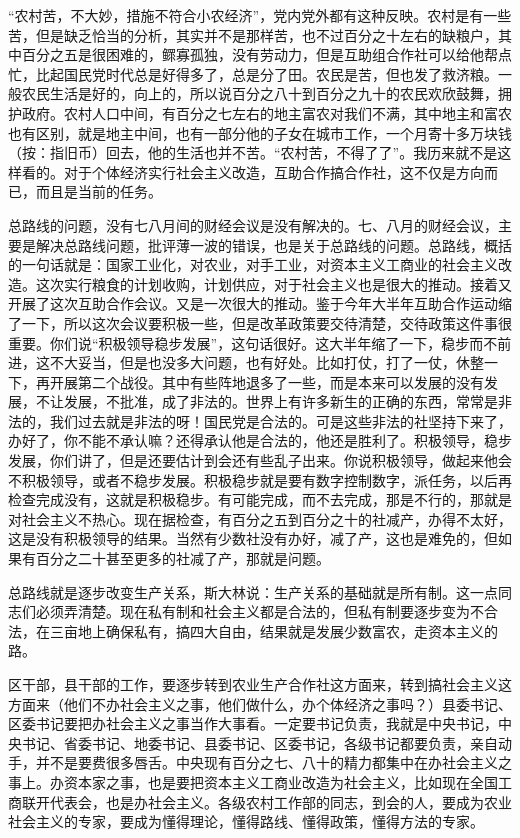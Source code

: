 “农村苦，不大妙，措施不符合小农经济”，党内党外都有这种反映。农村是有一些苦，但是缺乏恰当的分析，其实并不是那样苦，也不过百分之十左右的缺粮户，其中百分之五是很困难的，鳏寡孤独，没有劳动力，但是互助组合作社可以给他帮点忙，比起国民党时代总是好得多了，总是分了田。农民是苦，但也发了救济粮。一般农民生活是好的，向上的，所以说百分之八十到百分之九十的农民欢欣鼓舞，拥护政府。农村人口中间，有百分之七左右的地主富农对我们不满，其中地主和富农也有区别，就是地主中间，也有一部分他的子女在城市工作，一个月寄十多万块钱（按：指旧币）回去，他的生活也并不苦。“农村苦，不得了了”。我历来就不是这样看的。对于个体经济实行社会主义改造，互助合作搞合作社，这不仅是方向而已，而且是当前的任务。

总路线的问题，没有七八月间的财经会议是没有解决的。七、八月的财经会议，主要是解决总路线问题，批评薄一波的错误，也是关于总路线的问题。总路线，概括的一句话就是：国家工业化，对农业，对手工业，对资本主义工商业的社会主义改造。这次实行粮食的计划收购，计划供应，对于社会主义也是很大的推动。接着又开展了这次互助合作会议。又是一次很大的推动。鉴于今年大半年互助合作运动缩了一下，所以这次会议要积极一些，但是改革政策要交待清楚，交待政策这件事很重要。你们说“积极领导稳步发展”，这句话很好。这大半年缩了一下，稳步而不前进，这不大妥当，但是也没多大问题，也有好处。比如打仗，打了一仗，休整一下，再开展第二个战役。其中有些阵地退多了一些，而是本来可以发展的没有发展，不让发展，不批准，成了非法的。世界上有许多新生的正确的东西，常常是非法的，我们过去就是非法的呀！国民党是合法的。可是这些非法的社坚持下来了，办好了，你不能不承认嘛？还得承认他是合法的，他还是胜利了。积极领导，稳步发展，你们讲了，但是还要估计到会还有些乱子出来。你说积极领导，做起来他会不积极领导，或者不稳步发展。积极稳步就是要有数字控制数字，派任务，以后再检查完成没有，这就是积极稳步。有可能完成，而不去完成，那是不行的，那就是对社会主义不热心。现在据检查，有百分之五到百分之十的社减产，办得不太好，这是没有积极领导的结果。当然有少数社没有办好，减了产，这也是难免的，但如果有百分之二十甚至更多的社减了产，那就是问题。

总路线就是逐步改变生产关系，斯大林说：生产关系的基础就是所有制。这一点同志们必须弄清楚。现在私有制和社会主义都是合法的，但私有制要逐步变为不合法，在三亩地上确保私有，搞四大自由，结果就是发展少数富农，走资本主义的路。

区干部，县干部的工作，要逐步转到农业生产合作社这方面来，转到搞社会主义这方面来（他们不办社会主义之事，他们做什么，办个体经济之事吗？）县委书记、区委书记要把办社会主义之事当作大事看。一定要书记负责，我就是中央书记，中央书记、省委书记、地委书记、县委书记、区委书记，各级书记都要负责，亲自动手，并不是要费很多唇舌。中央现有百分之七、八十的精力都集中在办社会主义之事上。办资本家之事，也是要把资本主义工商业改造为社会主义，比如现在全国工商联开代表会，也是办社会主义。各级农村工作部的同志，到会的人，要成为农业社会主义的专家，要成为懂得理论，懂得路线、懂得政策，懂得方法的专家。

